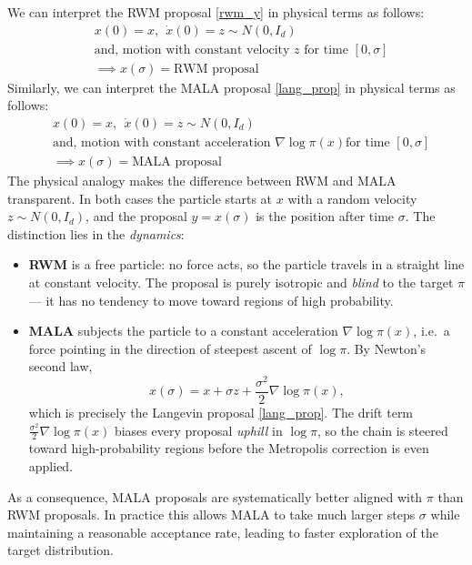 \documentclass{scrartcl}
\begin{document}
We can interpret the RWM proposal \eqref{rwm_y} in physical terms
as follows: 
\begin{equation}\label{rwm_phy}
  \begin{split}
  &  x(0) = x, ~~ \dot{x}(0) = z \sim N(0, I_d) \\
  & \text{and, motion with constant velocity $z$ for time $[0, \sigma]$} \\
  & \implies x(\sigma) = \text{RWM proposal}
  \end{split}  
\end{equation}
Similarly, we can interpret the MALA proposal \eqref{lang_prop} in
physical terms as follows: 
\begin{equation}\label{mala_phy}
  \begin{split}
  &  x(0) = x, ~~ \dot{x}(0) = z \sim N(0, I_d) \\
  & \text{and, motion with constant acceleration $\nabla \log \pi(x)$
    for time $[0, \sigma]$} \\ 
  & \implies x(\sigma) = \text{MALA proposal}
  \end{split}  
\end{equation}
The physical analogy makes the difference between RWM and MALA transparent.
In both cases the particle starts at $x$ with a random velocity $z \sim
N(0, I_d)$, and the proposal $y = x(\sigma)$ is the position after time
$\sigma$. The distinction lies in the \emph{dynamics}:
\begin{itemize}
  \item \textbf{RWM} is a free particle: no force acts, so the particle
    travels in a straight line at constant velocity. The proposal is
    purely isotropic and \emph{blind} to the target $\pi$ --- it has no
    tendency to move toward regions of high probability.

  \item \textbf{MALA} subjects the particle to a constant acceleration
    $\nabla \log \pi(x)$, i.e.\ a force pointing in the direction of
    steepest ascent of $\log\pi$. By Newton's second law,
    \[
      x(\sigma) = x + \sigma z + \frac{\sigma^2}{2}\nabla\log\pi(x),
    \]
    which is precisely the Langevin proposal \eqref{lang_prop}. The
    drift term $\frac{\sigma^2}{2}\nabla\log\pi(x)$ biases every
    proposal \emph{uphill} in $\log\pi$, so the chain is steered toward
    high-probability regions before the Metropolis correction is even
    applied.
\end{itemize}
As a consequence, MALA proposals are systematically better aligned with
$\pi$ than RWM proposals. In
practice this allows MALA to take much larger steps $\sigma$ while
maintaining a reasonable acceptance rate, leading to faster exploration
of the target distribution.
\end{document}
